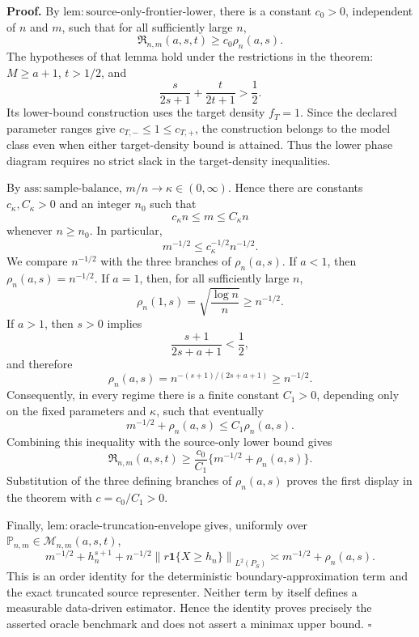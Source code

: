 \textbf{Proof.}
By \(\mathrm{lem:source\text{-}only\text{-}frontier\text{-}lower}\), there is a constant \(c_0>0\), independent of \(n\) and \(m\), such that for all sufficiently large \(n\),
\[
\mathfrak R_{n,m}(a,s,t)\ge c_0\rho_n(a,s).
\]
The hypotheses of that lemma hold under the restrictions in the theorem: \(M\ge a+1\), \(t>1/2\), and
\[
\frac{s}{2s+1}+\frac{t}{2t+1}>\frac12.
\]
Its lower-bound construction uses the target density \(f_T=1\). Since the declared parameter ranges give \(c_{T,-}\le 1\le c_{T,+}\), the construction belongs to the model class even when either target-density bound is attained. Thus the lower phase diagram requires no strict slack in the target-density inequalities.

By \(\mathrm{ass:sample\text{-}balance}\), \(m/n\to\kappa\in(0,\infty)\). Hence there are constants \(c_\kappa,C_\kappa>0\) and an integer \(n_0\) such that
\[
c_\kappa n\le m\le C_\kappa n
\]
whenever \(n\ge n_0\). In particular,
\[
m^{-1/2}\le c_\kappa^{-1/2}n^{-1/2}.
\]
We compare \(n^{-1/2}\) with the three branches of \(\rho_n(a,s)\). If \(a<1\), then \(\rho_n(a,s)=n^{-1/2}\). If \(a=1\), then, for all sufficiently large \(n\),
\[
\rho_n(1,s)=\sqrt{\frac{\log n}{n}}\ge n^{-1/2}.
\]
If \(a>1\), then \(s>0\) implies
\[
\frac{s+1}{2s+a+1}<\frac12,
\]
and therefore
\[
\rho_n(a,s)=n^{-(s+1)/(2s+a+1)}\ge n^{-1/2}.
\]
Consequently, in every regime there is a finite constant \(C_1>0\), depending only on the fixed parameters and \(\kappa\), such that eventually
\[
m^{-1/2}+\rho_n(a,s)\le C_1\rho_n(a,s).
\]
Combining this inequality with the source-only lower bound gives
\[
\mathfrak R_{n,m}(a,s,t)
\ge \frac{c_0}{C_1}\{m^{-1/2}+\rho_n(a,s)\}.
\]
Substitution of the three defining branches of \(\rho_n(a,s)\) proves the first display in the theorem with \(c=c_0/C_1>0\).

Finally, \(\mathrm{lem:oracle\text{-}truncation\text{-}envelope}\) gives, uniformly over \(\mathbb P_{n,m}\in\mathcal M_{n,m}(a,s,t)\),
\[
m^{-1/2}+h_n^{s+1}+n^{-1/2}
\left\|r\mathbf 1\{X\ge h_n\}\right\|_{L^2(P_S)}
\asymp m^{-1/2}+\rho_n(a,s).
\]
This is an order identity for the deterministic boundary-approximation term and the exact truncated source representer. Neither term by itself defines a measurable data-driven estimator. Hence the identity proves precisely the asserted oracle benchmark and does not assert a minimax upper bound. \(\square\)